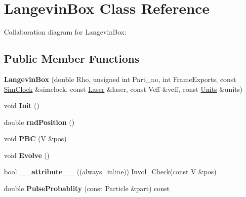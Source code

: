 \hypertarget{classLangevinBox}{}\section{Langevin\+Box Class Reference}
\label{classLangevinBox}


Collaboration diagram for Langevin\+Box\+:
\subsection*{Public Member Functions}
\begin{DoxyCompactItemize}
\item 
\mbox{\label{classLangevinBox_af58f59a428b99cfabb00c09a6add8f23}} 
{\bfseries Langevin\+Box} (double Rho, unsigned int Part\+\_\+no, int Frame\+Exports, const \hyperlink{classSimClock}{Sim\+Clock} \&simclock, const \hyperlink{classLaser}{Laser} \&laser, const Veff \&veff, const \hyperlink{classUnits}{Units} \&units)
\item 
\mbox{\label{classLangevinBox_ab5c54761689fd180f3f67e8c4a117ade}} 
void {\bfseries Init} ()
\item 
\mbox{\label{classLangevinBox_a62bd40e68cdc83dd354b666504c32772}} 
double {\bfseries rnd\+Position} ()
\item 
\mbox{\label{classLangevinBox_ad906bbf7afe0aac710071e0129b3c854}} 
void {\bfseries P\+BC} (V \&pos)
\item 
\mbox{\label{classLangevinBox_a6829167548ee73871ecc5391bf145da3}} 
void {\bfseries Evolve} ()
\item 
\mbox{\label{classLangevinBox_a9715e118323b2b784433347c7badb9ce}} 
bool {\bfseries \+\_\+\+\_\+attribute\+\_\+\+\_\+} ((always\+\_\+inline)) Invol\+\_\+\+Check(const V \&pos)
\item 
\mbox{\label{classLangevinBox_a386dc1cac12cf74f1018d5b8d3b0225e}} 
double {\bfseries Pulse\+Probablity} (const Particle \&part) const
\item 
\mbox{\label{classLangevinBox_a47a80c626ec74001c68dc0012d1d6360}} 

\end{DoxyCompactItemize}
